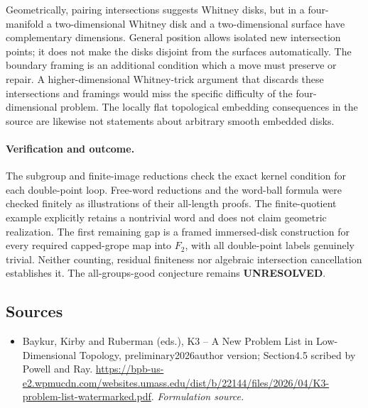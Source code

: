\documentclass[11pt]{article}
\begin{document}
Geometrically, pairing intersections suggests Whitney disks, but in a
four-manifold a two-dimensional Whitney disk and a two-dimensional
surface have complementary dimensions. General position allows isolated
new intersection points; it does not make the disks disjoint from the
surfaces automatically. The boundary framing is an additional condition
which a move must preserve or repair. A higher-dimensional Whitney-trick
argument that discards these intersections and framings would miss the
specific difficulty of the four-dimensional problem. The locally flat
topological embedding consequences in the source are likewise not
statements about arbitrary smooth embedded disks.

\paragraph{Verification and outcome.}
The subgroup and finite-image reductions check the exact kernel
condition for each double-point loop. Free-word reductions and the
word-ball formula were checked finitely as illustrations of their
all-length proofs. The finite-quotient example explicitly retains a
nontrivial word and does not claim geometric realization. The first
remaining gap is a framed immersed-disk construction for every required
capped-grope map into $F_2$, with all double-point labels genuinely
trivial. Neither counting, residual finiteness nor algebraic
intersection cancellation establishes it. The all-groups-good
conjecture remains \textbf{UNRESOLVED}.

\subsection{Sources}
\begin{itemize}
\item[S1]Baykur, Kirby and Ruberman (eds.), K3 – A New Problem List in Low-Dimensional Topology, preliminary2026author version; Section4.5 scribed by Powell and Ray.
\url{https://bpb-us-e2.wpmucdn.com/websites.umass.edu/dist/b/22144/files/2026/04/K3-problem-list-watermarked.pdf}.
\textit{Formulation source.}
\end{itemize}
\end{document}
